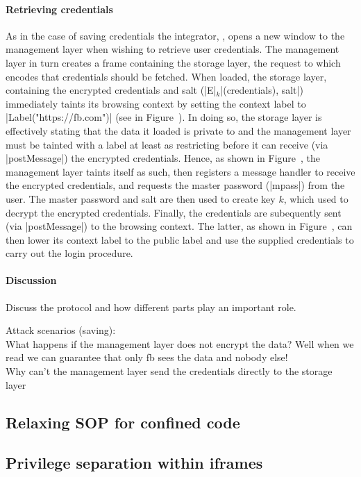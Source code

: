 \paragraph{Retrieving credentials}
%
As in the case of saving credentials the integrator, ,
opens a new window to the management layer when wishing to retrieve
user credentials.
%
The management layer in turn creates a frame containing the storage
layer, the request to which encodes that  credentials
should be fetched.
%
When loaded, the storage layer, containing the encrypted credentials
and salt (\js|E|$_k$\js|(credentials), salt|) immediately taints its
browsing context by setting the context label to
\js|Label("https://fb.com")| (see in Figure~).
%
In doing so, the storage layer is effectively stating that the data it
loaded is private to  and the management layer must be
tainted with a label at least as restricting before it can receive
(via \js|postMessage|) the encrypted credentials.
%
Hence, as shown in Figure~, the management
layer taints itself as such, then registers a message handler to
receive the encrypted credentials, and requests the master password
(\js|mpass|) from the user. 
%
The master password and salt are then used to create key $k$, which
used to decrypt the encrypted credentials.
%
Finally, the credentials are subequently sent (via \js|postMessage|)
to the  browsing context.
%
The latter, as shown in Figure~, can then lower
its context label to the public label and use the supplied credentials
to carry out the login procedure.

\paragraph{Discussion}
 Discuss the protocol and how different parts play an
important role.

Attack scenarios (saving):
\\
What happens if the management layer does not encrypt the data?
Well when we read we can guarantee that only fb sees the data and
nobody else! 
\\
Why can't the management layer send the credentials directly to the
storage layer


\subsection{Relaxing SOP for confined code}
\label{sec:system:mashup}

\subsection{Privilege separation within iframes}
\label{sec:system:script}
